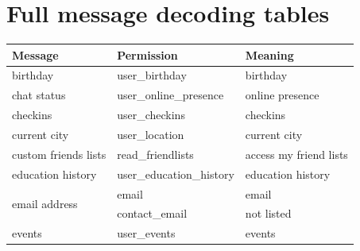 \documentclass[10pt]{sig-alternate-10pt}
\begin{document}



\appendix
\section{Full message decoding tables}
\label{appendix:decodetables}

\begin{subtables}
\begin{table}[htbp]
  \centering
  \begin{tabular}{|l|l|l|}
    \hline

    \textbf{Message}                      & \textbf{Permission}         & \textbf{Meaning} \cite{fbpermissions}                                                                            \\ \hline\hline
    birthday                              & user\_birthday              & birthday                                                                                    \\ \hline
    chat status                           & user\_online\_presence      & online presence                                                                             \\ \hline
    checkins                              & user\_checkins              & checkins                                                                                    \\ \hline
    current city                          & user\_location              & current city                                                                                \\ \hline
    custom friends lists                  & read\_friendlists           & access my friend lists                                                                      \\ \hline
    education history                     & user\_education\_history    & education history                                                                           \\ \hline
    \multirow{2}{*}{email address}        & email                       & email                                                                                       \\ \cline{2-3} 
    & contact\_email              & not listed                                                                                  \\ \hline
    events                                & user\_events                & events                                                                                      \\ \hline

\end{tabular}
\end{table}
\end{subtables}
\end{document}
